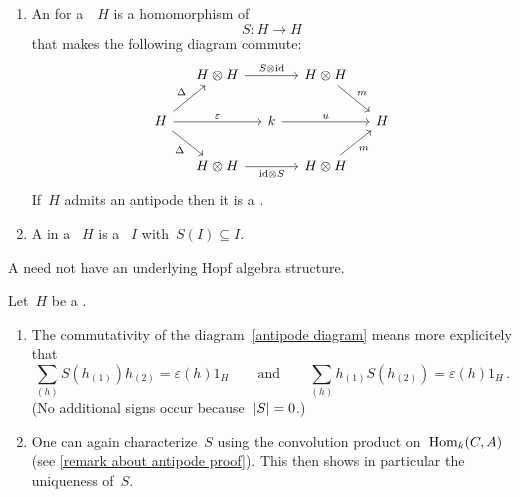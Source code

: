 \documentclass[a4paper,10pt,headings=standardclasses]{scrartcl}
\begin{document}
\begin{definition}
  \leavevmode
  \begin{enumerate}
    \item
      An  for a~{\dgb}~$H$ is a homomorphism of {\dgvs}
      \[
        S
        \colon
        H
        \to
        H
      \]
      that makes the following diagram commute:
      \begin{equation}
        \label{antipode diagram}
        \begin{tikzcd}[column sep = small]
          {}
          &
          H \tensor H
          \arrow{rr}[above]{S \tensor {\id}}
          &
          {}
          &
          H \tensor H
          \arrow{dr}[above right]{m}
          &
          {}
          \\
          H
          \arrow{ur}[above left]{\Delta}
          \arrow{rr}[above]{\varepsilon}
          \arrow{dr}[below left]{\Delta}
          &
          {}
          &
          k
          \arrow{rr}[above]{u}
          &
          {}
          &
          H
          \\
          {}
          &
          H \tensor H
          \arrow{rr}[below]{{\id} \tensor S}
          &
          {}
          &
          H \tensor H
          \arrow{ur}[below right]{m}
          &
          {}
        \end{tikzcd}
      \end{equation}
      If~$H$ admits an antipode then it is a .
    \item
      A  in a {\dgh}~$H$ is a {\dgbi}~$I$ with~$S(I) \subseteq I$.
  \end{enumerate}
\end{definition}

\begin{warning}
  A {\dgh} need not have an underlying Hopf algebra structure.
\end{warning}

\begin{remark}
  \label{remark about antipode}
  Let~$H$ be a {\dgh}.
  \begin{enumerate}
    \item
      The commutativity of the diagram~\eqref{antipode diagram} means more explicitely that
      \[
        \sum_{(h)} S(h_{(1)}) h_{(2)}
        =
        \varepsilon(h) 1_H
        \qquad\text{and}\qquad
        \sum_{(h)} h_{(1)} S(h_{(2)})
        =
        \varepsilon(h) 1_H  \,.
      \]
      (No additional signs occur because~$\lvert S\rvert = 0$.)
    \item
      One can again characterize~$S$ using the convolution product on~$\operatorname{Hom}_k(C,A)$ (see \cref{remark about antipode proof}).
      This then shows in particular the uniqueness of~$S$.
  \end{enumerate}
\end{remark}
\end{document}
